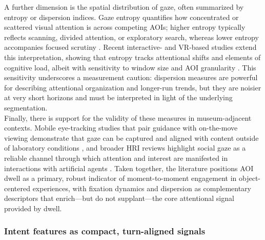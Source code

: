 \documentclass[12pt]{article}
\begin{document}
A further dimension is the spatial distribution of gaze, often summarized by entropy or dispersion indices. Gaze entropy quantifies how concentrated or scattered visual attention is across competing AOIs; higher entropy typically reflects scanning, divided attention, or exploratory search, whereas lower entropy accompanies focused scrutiny \citep{Gugerty2017}. Recent interactive- and VR-based studies extend this interpretation, showing that entropy tracks attentional shifts and elements of cognitive load, albeit with sensitivity to window size and AOI granularity \citep{Nguyen2024,Lee2024}. This sensitivity underscores a measurement caution: dispersion measures are powerful for describing attentional organization and longer-run trends, but they are noisier at very short horizons and must be interpreted in light of the underlying segmentation.\\

Finally, there is support for the validity of these measures in museum-adjacent contexts. Mobile eye-tracking studies that pair guidance with on-the-move viewing demonstrate that gaze can be captured and aligned with content outside of laboratory conditions \citep{mokatren2016listen}, and broader HRI reviews highlight social gaze as a reliable channel through which attention and interest are manifested in interactions with artificial agents \citep{admoni2017social}. Taken together, the literature positions AOI dwell as a primary, robust indicator of moment-to-moment engagement in object-centered experiences, with fixation dynamics and dispersion as complementary descriptors that enrich—but do not supplant—the core attentional signal provided by dwell.

\subsubsection{Intent features as compact, turn-aligned signals}
\end{document}
